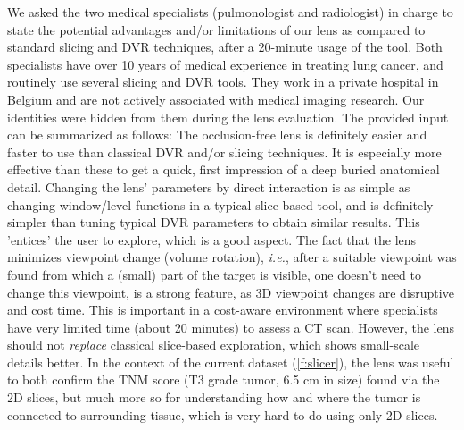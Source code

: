 We asked the two medical specialists (pulmonologist and radiologist) in charge to state the potential advantages and/or limitations of our lens as compared to standard slicing and DVR techniques, after a 20-minute usage of the tool. 
Both specialists have over 10 years of medical experience in treating lung cancer, and routinely use several slicing and DVR tools. They work in a private hospital in Belgium and are not actively associated with medical imaging research. Our identities were hidden from them during the lens evaluation. The provided input can be summarized as follows: The occlusion-free lens is definitely easier and faster to use than classical DVR and/or slicing techniques. It is especially more effective than these to get a quick, first impression of a deep buried anatomical detail. Changing the lens' parameters by direct interaction is as simple as changing window/level functions in a typical slice-based tool, and is definitely simpler than tuning typical DVR parameters to obtain similar results. This 'entices' the user to explore, which is a good aspect. The fact that the lens minimizes viewpoint change (volume rotation), \emph{i.e.}, after a suitable viewpoint was found from which a (small) part of the target is visible, one doesn't need to change this viewpoint, is a strong feature, as 3D viewpoint changes are disruptive and cost time. This is important in a cost-aware environment where specialists have very limited time (about 20 minutes) to assess a CT scan. However, the lens should not \emph{replace} classical slice-based exploration, which shows small-scale details better. In the context of the current dataset (\autoref{f:slicer}), the lens was useful to both confirm the TNM score (T3 grade tumor, 6.5 cm in size) found via the 2D slices, but much more so for understanding how and where the tumor is connected to surrounding tissue, which is very hard to do using only 2D slices.

